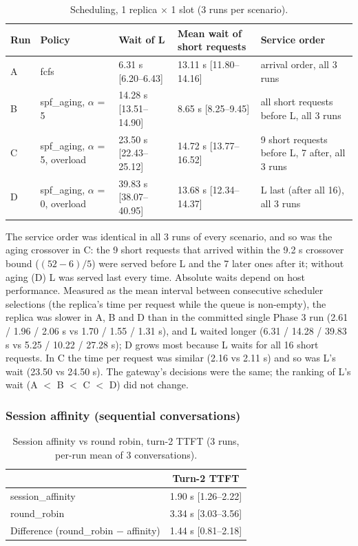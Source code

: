\documentclass[11pt,a4paper]{article}
\newcommand{\rng}[2]{[#1--#2]}
\begin{document}
\begin{table}[!htbp]
\centering\small
\caption{Scheduling, 1 replica $\times$ 1 slot (3 runs per scenario).}
\label{tab:sched}
\begin{tabularx}{\textwidth}{@{}P{0.6cm}P{3.1cm}P{2.6cm}P{2.8cm}L@{}}
\toprule
Run & Policy & Wait of L & Mean wait of short requests & Service order \\
\midrule
A & fcfs & 6.31 s \rng{6.20}{6.43} & 13.11 s \rng{11.80}{14.16} & arrival order, all 3 runs \\
B & spf\_aging, $\alpha$ = 5 & 14.28 s \rng{13.51}{14.90} & 8.65 s \rng{8.25}{9.45} & all short requests before L, all 3 runs \\
C & spf\_aging, $\alpha$ = 5, overload & 23.50 s \rng{22.43}{25.12} & 14.72 s \rng{13.77}{16.52} & 9 short requests before L, 7 after, all 3 runs \\
D & spf\_aging, $\alpha$ = 0, overload & 39.83 s \rng{38.07}{40.95} & 13.68 s \rng{12.34}{14.37} & L last (after all 16), all 3 runs \\
\bottomrule
\end{tabularx}
\end{table}

The service order was identical in all 3 runs of every scenario, and so was the aging crossover in
C: the 9 short requests that arrived within the 9.2 s crossover bound ($(52 - 6)/5$) were served
before L and the 7 later ones after it; without aging (D) L was served last every time. Absolute
waits depend on host performance. Measured as the mean interval between consecutive scheduler
selections (the replica's time per request while the queue is non-empty), the replica was slower in
A, B and D than in the committed single Phase 3 run (2.61 / 1.96 / 2.06 s vs 1.70 / 1.55 / 1.31 s),
and L waited longer (6.31 / 14.28 / 39.83 s vs 5.25 / 10.22 / 27.28 s); D grows most because L waits
for all 16 short requests. In C the time per request was similar (2.16 vs 2.11 s) and so was L's wait
(23.50 vs 24.50 s). The gateway's decisions were the same; the ranking of L's wait
(A $<$ B $<$ C $<$ D) did not change.

\subsubsection{Session affinity (sequential conversations)}
\label{sec:affinity}

\begin{table}[!htbp]
\centering\small
\caption{Session affinity vs round robin, turn-2 TTFT (3 runs, per-run mean of 3 conversations).}
\label{tab:affinity}
\begin{tabular}{@{}lc@{}}
\toprule
 & Turn-2 TTFT \\
\midrule
session\_affinity & 1.90 s \rng{1.26}{2.22} \\
round\_robin & 3.34 s \rng{3.03}{3.56} \\
Difference (round\_robin $-$ affinity) & 1.44 s \rng{0.81}{2.18} \\
\bottomrule
\end{tabular}
\end{table}
\end{document}
